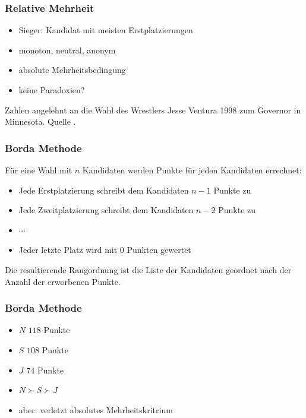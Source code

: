 \documentclass{beamer}
\begin{document}
\begin{frame}[fragile]
	\frametitle{Relative Mehrheit}
	\begin{itemize}
		\item Sieger: Kandidat mit meisten Erstplatzierungen
		\pause
		\item monoton, neutral, anonym
		\pause
		\item absolute Mehrheitsbedingung
		\pause
		\item keine Paradoxien?
	\end{itemize}
	\pause
	\begin{table}[h]
	\centering
	
		\caption{Zahlen angelehnt an die Wahl des Wrestlers Jesse Ventura 1998 zum Governor in Minnesota. Quelle \cite[Table 3.1]{hodge2005mathematics}.}
		\label{tab:wrestlerwahl}
	\end{table}
\end{frame}


\begin{frame}[fragile]
	\frametitle{Borda Methode}
	\begin{definition}
	Für eine Wahl mit $n$ Kandidaten werden Punkte für jeden Kandidaten errechnet:
	\begin{itemize}
	\item Jede Erstplatzierung schreibt dem Kandidaten $n-1$ Punkte zu
	\item Jede Zweitplatzierung schreibt dem Kandidaten $n-2$ Punkte zu
	\item $\cdots$
	\item Jeder letzte Platz wird mit $0$ Punkten gewertet
	\end{itemize}
	Die resultierende Rangordnung ist die Liste der Kandidaten geordnet nach der Anzahl der erworbenen Punkte.
	\end{definition}
\end{frame}

\begin{frame}[fragile]
	\frametitle{Borda Methode}

	\begin{table}[h]
	\centering
	
	\end{table}
	
	\begin{itemize}
		\item $N$ $118$ Punkte
		\item $S$ $108$ Punkte
		\item $J$ $74$ Punkte
		\item $ N \succ S \succ J $
		\pause
		\item aber: verletzt absolutes Mehrheitskritrium
	\end{itemize}
\end{frame}
\end{document}
